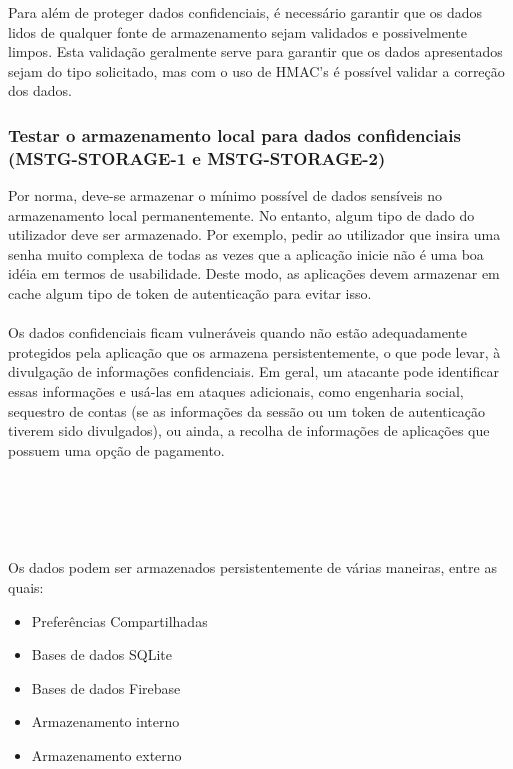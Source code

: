 \documentclass{article}
\begin{document}
Para além de proteger dados confidenciais, é necessário garantir que os dados lidos de qualquer fonte de armazenamento sejam validados e possivelmente limpos. Esta validação geralmente serve para garantir que os dados apresentados sejam do tipo solicitado, mas com o uso de HMAC's é possível validar a correção dos dados.


\subsubsection{Testar o armazenamento local para dados confidenciais (MSTG-STORAGE-1 e MSTG-STORAGE-2)}
Por norma, deve-se armazenar o mínimo possível de dados sensíveis no armazenamento local permanentemente. No entanto, algum tipo de dado do utilizador deve ser armazenado. Por exemplo, pedir ao utilizador que insira uma senha muito complexa de todas as vezes que a aplicação inicie não é uma boa idéia em termos de usabilidade. Deste modo, as aplicações devem armazenar em cache algum tipo de token de autenticação para evitar isso.
\\
\\
Os dados confidenciais ficam vulneráveis quando não estão adequadamente protegidos pela aplicação que os armazena persistentemente, o que pode levar, à divulgação de informações confidenciais. Em geral, um atacante pode identificar essas informações e usá-las em ataques adicionais, como engenharia social, sequestro de contas (se as informações da sessão ou um token de autenticação tiverem sido divulgados), ou ainda, a recolha de informações de aplicações que possuem uma opção de pagamento.
\\
\\
\\
\\
\\
\\
Os dados podem ser armazenados persistentemente de várias maneiras, entre as quais:
\begin{itemize}
    \item Preferências Compartilhadas
    \item Bases de dados SQLite
    \item Bases de dados Firebase
    \item Armazenamento interno
    \item Armazenamento externo
\end{itemize}
\end{document}
